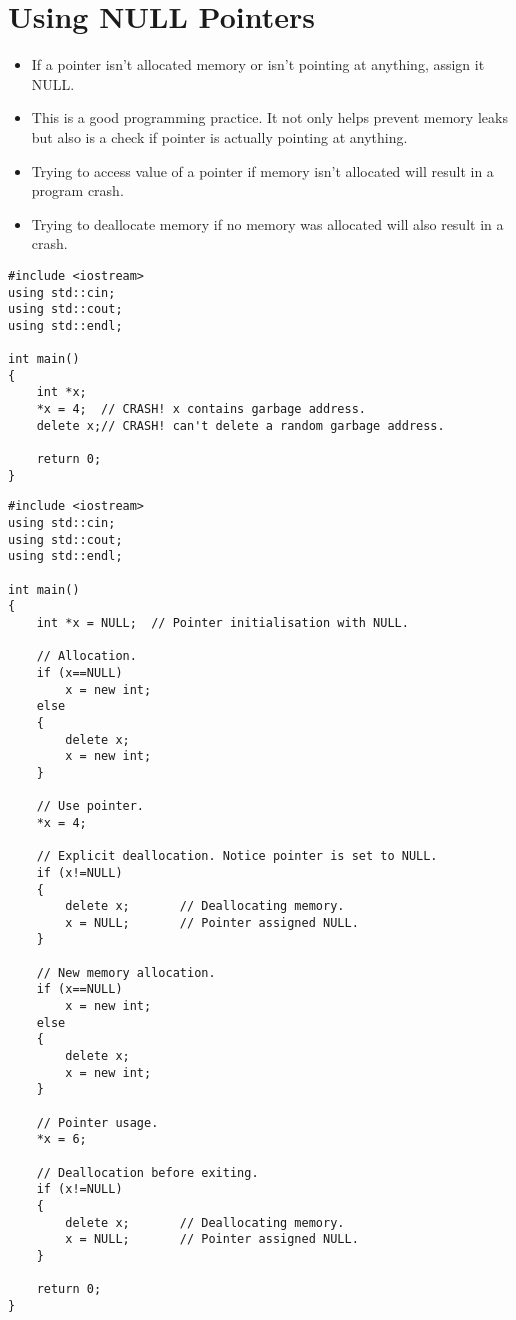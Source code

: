 \documentclass[12pt,a4paper]{article}
\begin{document}
\section{Using NULL Pointers}
\begin{itemize}
\item If a pointer isn't allocated memory or isn't pointing at anything, assign it NULL.
\item This is a good programming practice. It not only helps prevent memory leaks but also is a check if pointer is actually pointing at anything.
\item Trying to access value of a pointer if memory isn't allocated will result in a program crash.
\item Trying to deallocate memory if no memory was allocated will also result in a crash.
\end{itemize}
\begin{lstlisting}[caption={Two Typical Program Crashes}]
#include <iostream>
using std::cin;
using std::cout;
using std::endl;

int main()
{
	int *x;
	*x = 4;	 // CRASH! x contains garbage address.
	delete x;// CRASH! can't delete a random garbage address.
	
	return 0;
}
\end{lstlisting}
\begin{lstlisting}[caption={Using NULL to Properly Handle Pointers}]
#include <iostream>
using std::cin;
using std::cout;
using std::endl;

int main()
{
	int *x = NULL;	// Pointer initialisation with NULL.
	
	// Allocation.
	if (x==NULL)
		x = new int;
	else
	{
		delete x;
		x = new int;
	}
		
	// Use pointer.
	*x = 4;
	
	// Explicit deallocation. Notice pointer is set to NULL.
	if (x!=NULL)
	{
		delete x;		// Deallocating memory.
		x = NULL;		// Pointer assigned NULL.
	}

	// New memory allocation.
	if (x==NULL)
		x = new int;
	else
	{
		delete x;
		x = new int;
	}

	// Pointer usage.
	*x = 6;
	
	// Deallocation before exiting.
	if (x!=NULL)
	{
		delete x;		// Deallocating memory.
		x = NULL;		// Pointer assigned NULL.
	}
	
	return 0;
}
\end{lstlisting}
\end{document}
